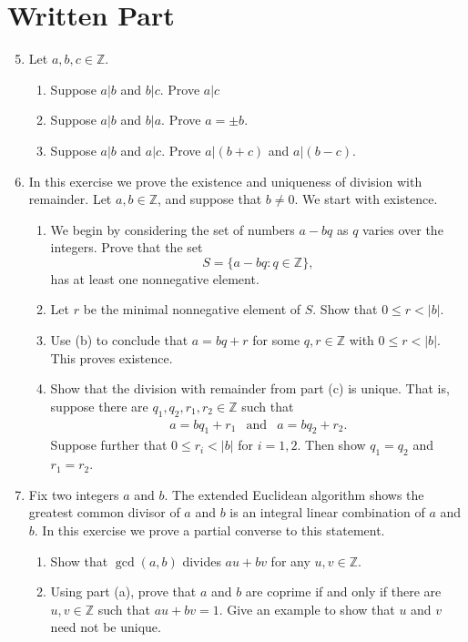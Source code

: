 \documentclass[11pt]{article}
\newcommand{\bZ}{\mathbb{Z}}
\begin{document}
\section*{Written Part}
\begin{enumerate}
  \setcounter{enumi}{4}
  \item{
  Let $a,b,c\in\bZ$.
  \begin{enumerate}
    \item{
    Suppose $a|b$ and $b|c$.  Prove $a|c$
    }
    \item{
    Suppose $a|b$ and $b|a$.  Prove $a=\pm b$.
    }
    \item{
    Suppose $a|b$ and $a|c$.  Prove $a|(b+c)$ and $a|(b-c)$.
    }
  \end{enumerate}
  }
  \item{
  In this exercise we prove the existence and uniqueness of division with remainder.  Let $a,b\in\bZ$, and suppose that $b\not=0$.  We start with existence.
  \begin{enumerate}
    \item{
    We begin by considering the set of numbers $a-bq$ as $q$ varies over the integers.  Prove that the set
    \[S = \{a-bq : q\in\bZ\},\]
    has at least one nonnegative element.
    }
    \item{
    Let $r$ be the minimal nonnegative element of $S$.  Show that $0\le r< |b|$.
    }
    \item{
    Use (b) to conclude that $a = bq+r$ for some $q,r\in\bZ$ with $0\le r<|b|$.  This proves existence.
    }
    \item{
    Show that the division with remainder from part (c) is unique.  That is, suppose there are $q_1,q_2,r_1,r_2\in\bZ$ such that
    \begin{eqnarray*}
      a = bq_1+r_1 &\text{and}&a= bq_2+r_2.
    \end{eqnarray*}
    Suppose further that $0\le r_i< |b|$ for $i=1,2$.  Then show $q_1=q_2$ and $r_1=r_2$.
    }
  \end{enumerate}
  }
  \item{
  Fix two integers $a$ and $b$.  The extended Euclidean algorithm shows the greatest common divisor of $a$ and $b$ is an integral linear combination of $a$ and $b$.  In this exercise we prove a partial converse to this statement.
  \begin{enumerate}
    \item{
    Show that $\gcd(a,b)$ divides $au+bv$ for any $u,v\in\bZ$.
    }
    \item{
    Using part (a), prove that $a$ and $b$ are coprime if and only if there are $u,v\in\bZ$ such that $au+bv=1$.  Give an example to show that $u$ and $v$ need not be unique.
}
\end{enumerate}}
\end{enumerate}
\end{document}
